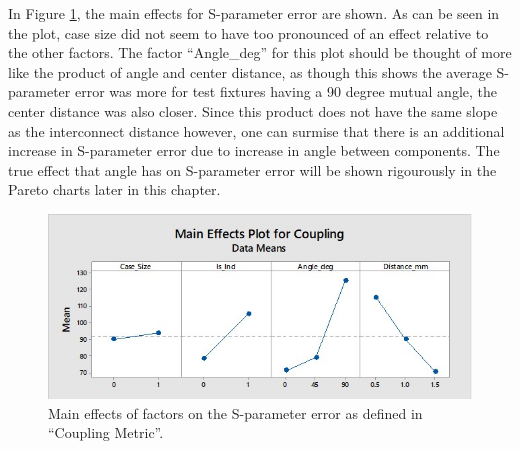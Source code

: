 \documentclass[12pt]{usfcoe}
\begin{document}
    In Figure \ref{fig:main_effects_coupling}, the main effects for S-parameter error are shown. 
    As can be seen in the plot, case size did not seem to have too pronounced of an effect relative to the other factors. 
    The factor ``Angle\_deg'' for this plot should be thought of more like the product of angle and center distance, as though this shows the average S-parameter error was more for test fixtures having a 90 degree mutual angle, the center distance was also closer.
    Since this product does not have the same slope as the interconnect distance however, one can surmise that there is an additional increase in S-parameter error due to increase in angle between components.
    The true effect that angle has on S-parameter error will be shown rigourously in the Pareto charts later in this chapter. 

    \begin{figure}[H]
		\begin{center}
            \includegraphics[width=\textwidth]{images/ANOVA/CouplingMainEffects.jpg} 
			\caption{Main effects of factors on the S-parameter error as defined in ``Coupling Metric''.} 
			\label{fig:main_effects_coupling}
		\end{center}
    \end{figure}    
\end{document}
